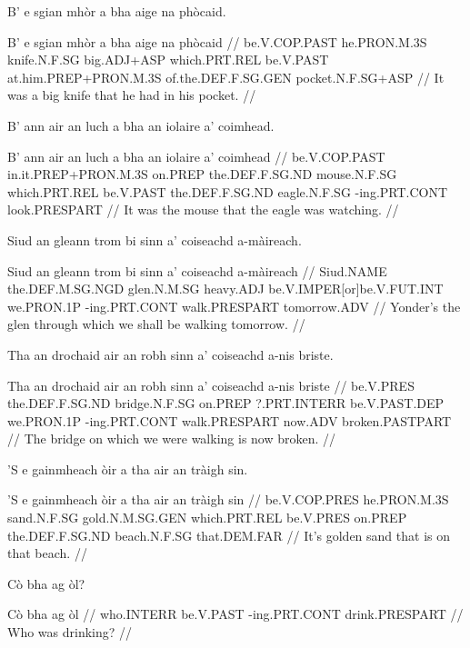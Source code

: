 \documentclass[a4paper,10pt]{article}
\begin{document}
\ex
\begingl
\glpre B' e sgian mhòr a bha aige na phòcaid. 

\vspace{4mm}
\gla B' e sgian mhòr a bha aige na phòcaid  //
\glb be.V.COP.PAST he.PRON.M.3S knife.N.F.SG big.ADJ+ASP which.PRT.REL be.V.PAST at.him.PREP+PRON.M.3S of.the.DEF.F.SG.GEN pocket.N.F.SG+ASP  //
\glft It was a big knife that he had in his pocket. //
\endgl
\xe

\ex
\begingl
\glpre B' ann air an luch a bha an iolaire a' coimhead. 

\vspace{4mm}
\gla B' ann air an luch a bha an iolaire a' coimhead  //
\glb be.V.COP.PAST in.it.PREP+PRON.M.3S on.PREP the.DEF.F.SG.ND mouse.N.F.SG which.PRT.REL be.V.PAST the.DEF.F.SG.ND eagle.N.F.SG -ing.PRT.CONT look.PRESPART  //
\glft It was the mouse that the eagle was watching. //
\endgl
\xe

\ex
\begingl
\glpre Siud an gleann trom bi sinn a' coiseachd a-màireach. 

\vspace{4mm}
\gla Siud an gleann trom bi sinn a' coiseachd a-màireach  //
\glb Siud.NAME the.DEF.M.SG.NGD glen.N.M.SG heavy.ADJ be.V.IMPER[or]be.V.FUT.INT we.PRON.1P -ing.PRT.CONT walk.PRESPART tomorrow.ADV  //
\glft Yonder's the glen through which we shall be walking tomorrow. //
\endgl
\xe

\ex
\begingl
\glpre Tha an drochaid air an robh sinn a' coiseachd a-nis briste. 

\vspace{4mm}
\gla Tha an drochaid air an robh sinn a' coiseachd a-nis briste  //
\glb be.V.PRES the.DEF.F.SG.ND bridge.N.F.SG on.PREP ?.PRT.INTERR be.V.PAST.DEP we.PRON.1P -ing.PRT.CONT walk.PRESPART now.ADV broken.PASTPART  //
\glft The bridge on which we were walking is now broken. //
\endgl
\xe

\ex
\begingl
\glpre 'S e gainmheach òir a tha air an tràigh sin. 

\vspace{4mm}
\gla 'S e gainmheach òir a tha air an tràigh sin  //
\glb be.V.COP.PRES he.PRON.M.3S sand.N.F.SG gold.N.M.SG.GEN which.PRT.REL be.V.PRES on.PREP the.DEF.F.SG.ND beach.N.F.SG that.DEM.FAR  //
\glft It's golden sand that is on that beach. //
\endgl
\xe

\ex
\begingl
\glpre Cò bha ag òl? 

\vspace{4mm}
\gla Cò bha ag òl  //
\glb who.INTERR be.V.PAST -ing.PRT.CONT drink.PRESPART  //
\glft Who was drinking? //
\endgl
\xe
\end{document}
